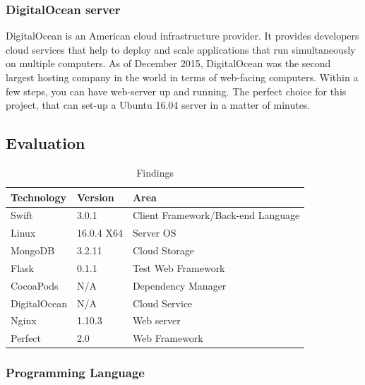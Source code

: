 \subsubsection{DigitalOcean server}

DigitalOcean \cite{digital} is an American cloud infrastructure provider. It provides developers cloud services that help to deploy and scale applications that run simultaneously on multiple computers. As of December 2015, DigitalOcean was the second largest hosting company in the world in terms of web-facing computers. Within a few steps, you can have web-server up and running. The perfect choice for this project, that can set-up a Ubuntu 16.04 server in a matter of minutes. 

\newpage
\subsection{Evaluation}

\begin{table}[!h]
\centering
\caption{Findings}
\label{my-label}
\begin{tabular}{|l|l|l|}
\hline
\cellcolor{green!20}Technology & \cellcolor{green!20}Version  & \cellcolor{green!20}Area \\ \hline
Swift      & 3.0.1      & Client Framework/Back-end Language \\ \hline
Linux      & 16.0.4 X64 & Server OS                          \\ \hline
MongoDB    & 3.2.11     & Cloud Storage                      \\ \hline
Flask      & 0.1.1      & Test Web Framework                 \\ \hline
CocoaPods  & N/A        & Dependency Manager                 \\ \hline
DigitalOcean    & N/A     & Cloud Service               \\ \hline
Nginx            & 1.10.3       & Web server               \\ \hline
Perfect            & 2.0      & Web Framework               \\ \hline
\end{tabular}
\end{table}

\subsubsection{Programming Language}

